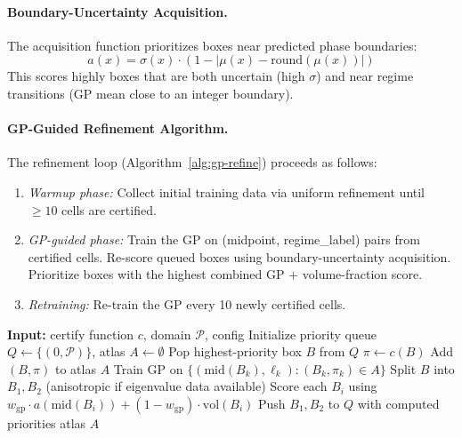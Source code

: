 \documentclass[11pt]{article}
\begin{document}
\paragraph{Boundary-Uncertainty Acquisition.}
The acquisition function prioritizes boxes near predicted phase boundaries:
\[
a(x) = \sigma(x) \cdot (1 - |\mu(x) - \mathrm{round}(\mu(x))|)
\]
This scores highly boxes that are both uncertain (high $\sigma$) and near regime transitions (GP mean close to an integer boundary).

\paragraph{GP-Guided Refinement Algorithm.}
The refinement loop (Algorithm~\ref{alg:gp-refine}) proceeds as follows:
\begin{enumerate}
\item \emph{Warmup phase:} Collect initial training data via uniform refinement until $\geq 10$ cells are certified.
\item \emph{GP-guided phase:} Train the GP on (midpoint, regime\_label) pairs from certified cells. Re-score queued boxes using boundary-uncertainty acquisition. Prioritize boxes with the highest combined GP + volume-fraction score.
\item \emph{Retraining:} Re-train the GP every 10 newly certified cells.
\end{enumerate}

\begin{algorithm}[t]
\caption{GP-Guided Adaptive Refinement}
\label{alg:gp-refine}
\begin{algorithmic}[1]
\State \textbf{Input:} certify function $c$, domain $\mathcal{P}$, config
\State Initialize priority queue $Q \leftarrow \{(0, \mathcal{P})\}$, atlas $A \leftarrow \emptyset$
  \State Pop highest-priority box $B$ from $Q$
  \State $\pi \leftarrow c(B)$ 
    \State Add $(B, \pi)$ to atlas $A$
      \State Train GP on $\{(\mathrm{mid}(B_k), \ell_k) : (B_k, \pi_k) \in A\}$
    \EndIf
  \Else
    \State Split $B$ into $B_1, B_2$ (anisotropic if eigenvalue data available)
    \State Score each $B_i$ using $w_{\mathrm{gp}} \cdot a(\mathrm{mid}(B_i)) + (1 - w_{\mathrm{gp}}) \cdot \mathrm{vol}(B_i)$
    \State Push $B_1, B_2$ to $Q$ with computed priorities
  \EndIf
\EndWhile
\State \Return atlas $A$
\end{algorithmic}
\end{algorithm}
\end{document}
